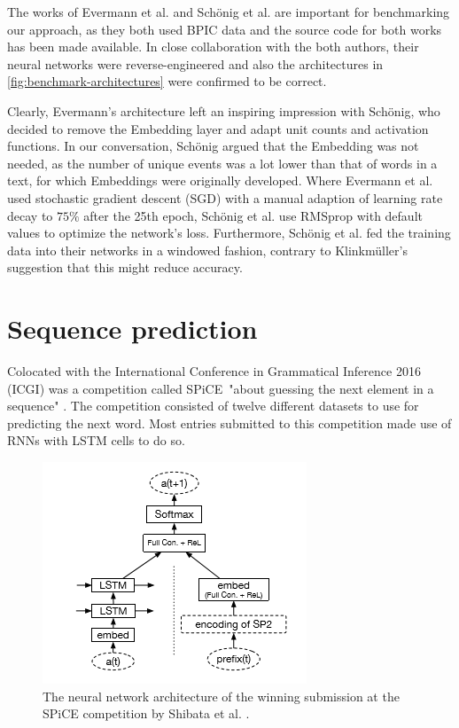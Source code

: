 The works of Evermann et al. and Schönig et al. are important for benchmarking our approach, as they both used BPIC data and the source code for both works has been made available. In close collaboration with the both authors, their neural networks were reverse-engineered and also the architectures in \autoref{fig:benchmark-architectures} were confirmed to be correct.

Clearly, Evermann's architecture left an inspiring impression with Schönig, who decided to remove the Embedding layer and adapt unit counts and activation functions. In our conversation, Schönig argued that the Embedding was not needed, as the number of unique events was a lot lower than that of words in a text, for which Embeddings were originally developed. Where Evermann et al. used stochastic gradient descent (SGD) with a manual adaption of learning rate decay to $75\%$ after the 25th epoch, Schönig et al. use RMSprop with default values to optimize the network's loss. Furthermore, Schönig et al. fed the training data into their networks in a windowed fashion, contrary to Klinkmüller's suggestion that this might reduce accuracy.

\section{Sequence prediction}
\label{sec:related-work-sequence-prediction}
Colocated with the International Conference in Grammatical Inference 2016 (ICGI) was a competition called SPiCE\ "about guessing the next element in a sequence" \cite{web:spice}. The competition consisted of twelve different datasets to use for predicting the next word. Most entries submitted to this competition made use of RNNs with LSTM cells to do so.\\

\begin{figure}
    \centering
    \includegraphics[height=.4\textwidth]{gfx/spice-winner-architecture.png}
    \caption{The neural network architecture of the winning submission at the SPiCE competition by Shibata et al. \cite{shibata2016bipartite}.}
    \label{fig:spice-winner-architecture}
\end{figure}

